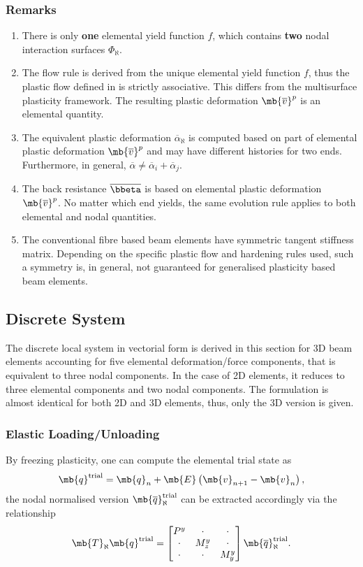 \subsubsection{Remarks}
\begin{enumerate}
\item There is only \textbf{one} elemental yield function $f$, which contains \textbf{two} nodal interaction surfaces $\Phi_\aleph$.
\item The flow rule is derived from the unique elemental yield function $f$, thus the plastic flow defined in  is strictly associative. This differs from the multisurface plasticity framework. The resulting plastic deformation $\mb{\overline{v}}^p$ is an elemental quantity.
\item The equivalent plastic deformation $\overline{\alpha}_\aleph$ is computed based on part of elemental plastic deformation $\mb{\overline{v}}^p$ and may have different histories for two ends. Furthermore, in general, $\overline{\alpha}\neq\overline{\alpha}_i+\overline{\alpha}_j$.
\item The back resistance $\overline{\bbeta}$ is based on elemental plastic deformation $\mb{\overline{v}}^p$. No matter which end yields, the same evolution rule applies to both elemental and nodal quantities.
\item The conventional fibre based beam elements have symmetric tangent stiffness matrix. Depending on the specific plastic flow and hardening rules used, such a symmetry is, in general, not guaranteed for generalised plasticity based beam elements.
\end{enumerate}
\subsection{Discrete System}
The discrete local system in vectorial form is derived in this section for 3D beam elements accounting for five elemental deformation/force components, that is equivalent to three nodal components. In the case of 2D elements, it reduces to three elemental components and two nodal components. The formulation is almost identical for both 2D and 3D elements, thus, only the 3D version is given.
\subsubsection{Elastic Loading/Unloading}
By freezing plasticity, one can compute the elemental trial state as
\begin{gather}\label{eq:nm_qa}
\mb{q}^\text{trial}=\mb{q}_n+\mb{E}\left(\mb{v}_{n+1}-\mb{v}_n\right),
\end{gather}
the nodal normalised version $\mb{\overline{q}}_\aleph^\text{trial}$ can be extracted accordingly via the relationship
\begin{gather}\label{eq:nm_qb}
\mb{T}_\aleph\mb{q}^\text{trial}=\begin{bmatrix}
P^y&\cdot&\cdot\\\cdot&M_z^y&\cdot\\\cdot&\cdot&M_y^y
\end{bmatrix}\mb{\overline{q}}_\aleph^\text{trial}.
\end{gather}

